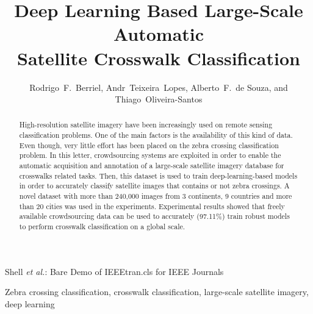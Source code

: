 \documentclass[journal]{IEEEtran}
\newcommand{\IEEECopyrightMessage}{\copyright~2017 IEEE. Personal use of this material is permitted. Permission from IEEE must be obtained for all other uses, in any current or future media, including reprinting/republishing this material for advertising or promotional purposes, creating new collective works, for resale or redistribution to servers or lists, or reuse of any copyrighted component of this work in other works.\xspace}
\begin{document}

\title{Deep Learning Based Large-Scale Automatic\\Satellite Crosswalk Classification}

\author{
	Rodrigo~F.~Berriel,
	Andr~Teixeira~Lopes,
	Alberto~F.~de Souza,
	and Thiago~Oliveira-Santos%
}

\markboth{}%
{Shell \MakeLowercase{\textit{et al.}}: Bare Demo of IEEEtran.cls for IEEE Journals}

\maketitle

\makeatletter
\def\ps@IEEEtitlepagestyle{
	\def\@oddfoot{\mycopyrightnotice}
	\def\@evenfoot{}
}
\def\mycopyrightnotice{
	{\footnotesize
		\begin{minipage}{\textwidth}
			\centering
			\scriptsize
			\IEEECopyrightMessage
		\end{minipage}
	}
}
\newcommand\copyrightnotice{%
	\begin{tikzpicture}[remember picture,overlay]
	\node[anchor=south,yshift=10pt] at (current page.south) {\fbox{\parbox{\dimexpr\textwidth-\fboxsep-\fboxrule\relax}{\copyrighttext}}};
	\end{tikzpicture}%
}

\begin{abstract}
	High-resolution satellite imagery have been increasingly used on remote sensing classification problems. One of the main factors is the availability of this kind of data. Even though, very little effort has been placed on the zebra crossing classification problem. In this letter, crowdsourcing systems are exploited in order to enable the automatic acquisition and annotation of a large-scale satellite imagery database for crosswalks related tasks. Then, this dataset is used to train deep-learning-based models in order to accurately classify satellite images that contains or not zebra crossings. A novel dataset with more than 240,000 images from 3 continents, 9 countries and more than 20 cities was used in the experiments. Experimental results showed that freely available crowdsourcing data can be used to accurately (97.11\%) train robust models to perform crosswalk classification on a global scale.
\end{abstract}

\begin{IEEEkeywords}
	Zebra crossing classification, crosswalk classification, large-scale satellite imagery, deep learning
\end{IEEEkeywords}
\end{document}
